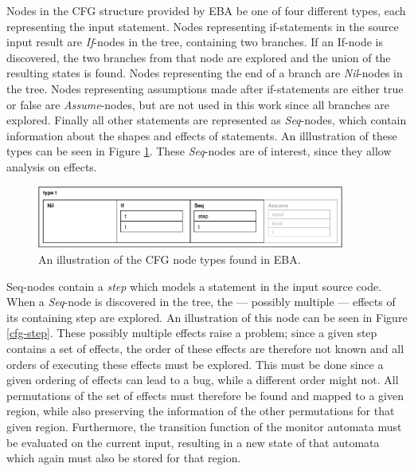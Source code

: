 \noindent Nodes in the CFG structure provided by EBA be one of four different types, each representing the input statement. Nodes representing if-statements in the source input result are \textit{If}-nodes in the tree, containing two branches. If an If-node is discovered, the two branches from that node are explored and the union of the resulting states is found. Nodes representing the end of a branch are \textit{Nil}-nodes in the tree. Nodes representing assumptions made after if-statements are either true or false are \textit{Assume}-nodes, but are not used in this work since all branches are explored. Finally all other statements are represented as \textit{Seq}-nodes, which contain information about the shapes and effects of statements. An illlustration of these types can be seen in Figure \ref{cfg-nodes}. These \textit{Seq}-nodes are of interest, since they allow analysis on effects.  

\begin{figure}[H]
    \centering
    \includegraphics[width=0.9\textwidth]{implementation/figures/node}
    \caption{An illustration of the CFG node types found in EBA.}
    \label{cfg-nodes}
\end{figure}

\noindent Seq-nodes contain a \textit{step} which models a statement in the input source code. When a \textit{Seq}-node is discovered in the tree, the --- possibly multiple --- effects of its containing step are explored. An illustration of this node can be seen in Figure \ref{cfg-step}. These possibly multiple effects raise a problem; since a given step contains a set of effects, the order of these effects are therefore not known and all orders of executing these effects must be explored. This must be done since a given ordering of effects can lead to a bug, while a different order might not. All permutations of the set of effects must therefore be found and mapped to a given region, while also preserving the information of the other permutations for that given region. Furthermore, the transition function of the monitor automata must be evaluated on the current input, resulting in a new state of that automata which again must also be stored for that region.

